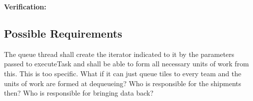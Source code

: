 \documentclass{article}
\begin{document}
\begin{req}
\end{req}
\textbf{Verification:}\hspace{0.125in}

\subsection{Possible Requirements}


The queue thread shall create the iterator indicated to it by the parameters
passed to executeTask and shall be able to form all necessary units of work from
this.  This is too specific.  What if it can just queue tiles to every team and
the units of work are formed at dequeueing?  Who is responsible for the
shipments then?  Who is responsible for bringing data back?


\end{document}
